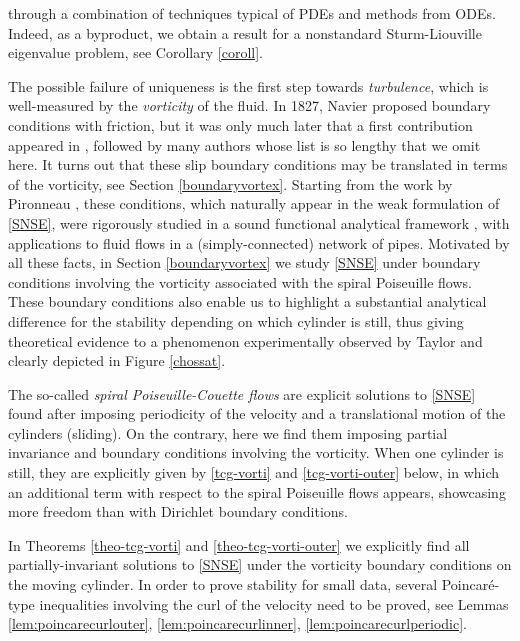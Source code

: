 \documentclass[a4paper,11pt]{amsart}
\numberwithin{equation}{section}
\numberwithin{figure}{section}
\begin{document}
through a combination of techniques typical of PDEs and methods from ODEs. Indeed, 
as a byproduct, we obtain a result for a 
nonstandard Sturm-Liouville eigenvalue problem, see
Corollary \ref{coroll}.
\par
The possible failure of uniqueness is the first step towards {\em turbulence}, which is well-measured by the {\em vorticity} of the fluid.  
	In 1827, Navier \cite{navier} proposed boundary conditions with friction, but it was only much later
    that a first contribution appeared in \cite{solonnikov}, followed by many authors whose list is so lengthy that we omit here. It turns out that these slip boundary conditions may be translated in terms of the vorticity, see Section \ref{boundaryvortex}.
    Starting from the work by Pironneau \cite{pironneau}, these conditions, which naturally appear in the weak formulation of \eqref{SNSE}, were rigorously studied in a sound
	functional analytical framework \cite{begue1987nouveau,concafrench,concaenglish}, with applications to fluid flows in a (simply-connected) network of pipes. Motivated by all these facts, in Section 
\ref{boundaryvortex} we study \eqref{SNSE} under boundary conditions involving the vorticity associated with the spiral Poiseuille flows. These boundary conditions also enable us to highlight a substantial analytical difference for the stability depending on which cylinder is still, thus giving theoretical evidence to a phenomenon experimentally observed by Taylor \cite[pp.291-292]{taylor} and clearly depicted in Figure \ref{chossat}.\par
    The so-called \emph{spiral Poiseuille-Couette flows} \cite{Joseph,Titi} are explicit solutions to \eqref{SNSE} found after imposing periodicity of the velocity and a translational motion of the cylinders (sliding). On the contrary, here we find them imposing partial invariance and boundary conditions involving the vorticity. 
    When one cylinder is still, they are explicitly given by \eqref{tcg-vorti} and \eqref{tcg-vorti-outer} below, in which an additional term with respect to the spiral Poiseuille flows appears, showcasing more freedom than with Dirichlet boundary conditions.\par
  In Theorems \ref{theo-tcg-vorti} 
  and \ref{theo-tcg-vorti-outer} we explicitly find all partially-invariant 
  solutions to \eqref{SNSE} under the vorticity boundary conditions on the moving cylinder. 
In order to prove stability for small data, several Poincaré-type inequalities involving the curl of the velocity need to be proved, see 
Lemmas \ref{lem:poincarecurlouter}, \ref{lem:poincarecurlinner}, \ref{lem:poincarecurlperiodic}.
\end{document}
